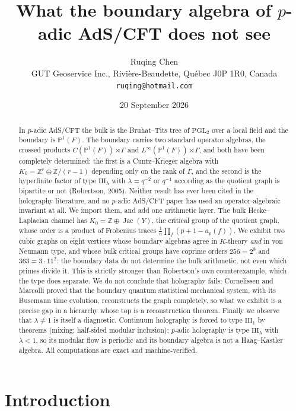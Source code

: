 \documentclass[11pt]{article}
\title{\bfseries What the boundary algebra of $p$-adic AdS/CFT does not see}
\author{Ruqing Chen\\[2pt]
\normalsize GUT Geoservice Inc., Rivi\`ere-Beaudette, Qu\'ebec J0P 1R0, Canada\\
\normalsize\texttt{ruqing@hotmail.com}}
\date{20 September 2026}
\theoremstyle{plain}
\theoremstyle{remark}
\newcommand{\Z}{\mathbb{Z}}
\newcommand{\PP}{\mathbb{P}}
\newcommand{\Jac}{\operatorname{Jac}}
\newcommand{\III}{\mathrm{III}}
\begin{document}
\maketitle

\begin{abstract}
\noindent
In $p$-adic AdS/CFT the bulk is the Bruhat--Tits tree of $\mathrm{PGL}_2$ over a local
field and the boundary is $\PP^1(F)$. The boundary carries two standard operator algebras,
the crossed products $C(\PP^1(F))\rtimes\Gamma$ and $L^\infty(\PP^1(F))\rtimes\Gamma$, and
both have been completely determined: the first is a Cuntz--Krieger algebra with
$K_0=\Z^{r}\oplus\Z/(r-1)$ depending only on the rank of $\Gamma$, and the second is the
hyperfinite factor of type $\III_\lambda$ with $\lambda=q^{-2}$ or $q^{-1}$ according as
the quotient graph is bipartite or not (Robertson, 2005). Neither result has ever been
cited in the holography literature, and no $p$-adic AdS/CFT paper has used an
operator-algebraic invariant at all. We import them, and add one arithmetic layer. The
bulk Hecke--Laplacian channel has $K_0=\Z\oplus\Jac(Y)$, the critical group of the
quotient graph, whose order is a product of Frobenius traces
$\frac1n\prod_f(p+1-a_p(f))$. We exhibit two cubic graphs on eight vertices whose boundary
algebras agree in $K$-theory \emph{and} in von Neumann type, and whose bulk critical groups
have coprime orders $256=2^8$ and $363=3\cdot11^2$: the boundary data do not determine the
bulk arithmetic, not even which primes divide it. This is strictly stronger than
Robertson's own counterexample, which the type does separate. We do not conclude that
holography fails: Cornelissen and Marcolli proved that the boundary quantum statistical
mechanical system, with its Busemann time evolution, reconstructs the graph completely, so
what we exhibit is a precise gap in a hierarchy whose top is a reconstruction theorem.
Finally we observe that $\lambda\ne1$ is itself a diagnostic. Continuum holography is
forced to type $\III_1$ by theorems (mixing; half-sided modular inclusion); $p$-adic
holography is type $\III_\lambda$ with $\lambda<1$, so its modular flow is periodic and its
boundary algebra is not a Haag--Kastler algebra. All computations are exact and
machine-verified.
\end{abstract}

\section{Introduction}\label{sec:intro}
\end{document}
